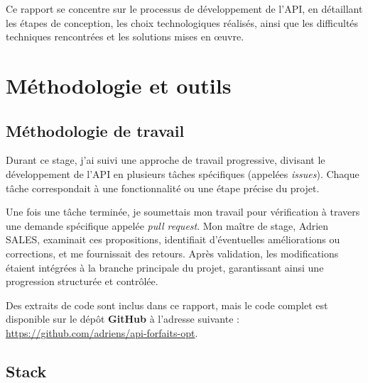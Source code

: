 \documentclass{article}
\begin{document}
	Ce rapport se concentre sur le processus de développement de l’API, en détaillant les étapes de conception, les choix technologiques réalisés, ainsi que les difficultés techniques rencontrées et les solutions mises en œuvre.
	
	\newpage
	\section{Méthodologie et outils}
	
	\subsection{Méthodologie de travail}
	
	Durant ce stage, j'ai suivi une approche de travail progressive, divisant le développement de l'API en plusieurs tâches spécifiques (appelées \textit{issues}). Chaque tâche correspondait à une fonctionnalité ou une étape précise du projet.
	
	Une fois une tâche terminée, je soumettais mon travail pour vérification à travers une demande spécifique appelée \textit{pull request}. Mon maître de stage, Adrien SALES, examinait ces propositions, identifiait d'éventuelles améliorations ou corrections, et me fournissait des retours. Après validation, les modifications étaient intégrées à la branche principale du projet, garantissant ainsi une progression structurée et contrôlée.
	
	Des extraits de code sont inclus dans ce rapport, mais le code complet est disponible sur le dépôt \textbf{GitHub} à l'adresse suivante : \url{https://github.com/adriens/api-forfaits-opt}.
	
	\subsection{Stack}
	
\end{document}

